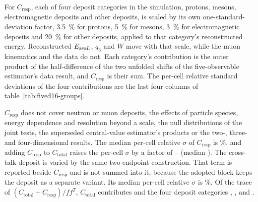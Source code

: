 For $C_{\mathrm{resp}}$, each of four deposit categories in the simulation, protons, mesons, electromagnetic deposits and other deposits, is scaled by its own one-standard-deviation factor, \SI{3.5}{\percent} for protons, \SI{5}{\percent} for mesons, \SI{3}{\percent} for electromagnetic deposits and \SI{20}{\percent} for other deposits, applied to that category's reconstructed energy. Reconstructed $E_{\mathrm{avail}}$, $q_3$ and $W$ move with that scale, while the muon kinematics and the data do not. Each category's contribution is the outer product of the half-difference of the two unfolded shifts of the five-observable estimator's data result, and $C_{\mathrm{resp}}$ is their sum. The per-cell relative standard deviations of the four contributions are the last four columns of table~\ref{tab:fived16-groups}.

$C_{\mathrm{resp}}$ does not cover neutron or muon deposits, the effects of particle species, energy dependence and resolution beyond a scale, the null distributions of the joint tests, the superseded central-value estimator's products or the two-, three- and four-dimensional results. The median per-cell relative $\sigma$ of $C_{\mathrm{resp}}$ is \%, and adding $C_{\mathrm{resp}}$ to $C_{\mathrm{total}}$ raises the per-cell $\sigma$ by a factor of -- (median ). The cross-talk deposit is varied by the same two-endpoint construction. That term is reported beside $C_{\mathrm{resp}}$ and is not summed into it, because the adopted block keeps the deposit as a separate variant. Its median per-cell relative $\sigma$ is \%. Of the trace of $(C_{\mathrm{total}}+C_{\mathrm{resp}})/f f^{T}$, $C_{\mathrm{total}}$ contributes  and the four deposit categories , ,  and .

